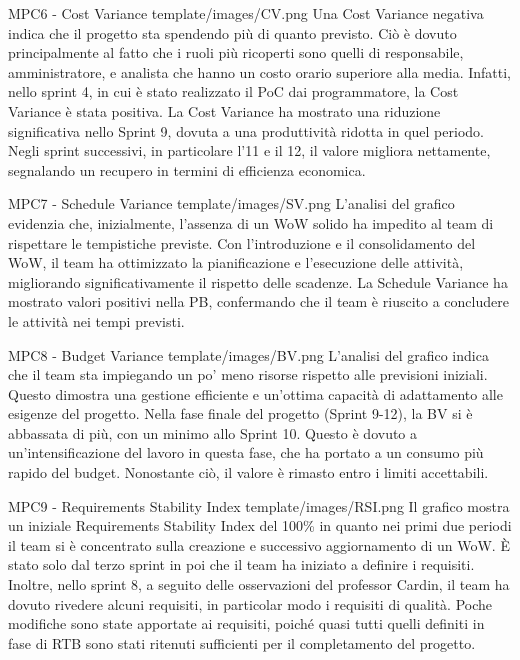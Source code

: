 \Met
{ %
    MPC6 - Cost Variance
}
{ %
    template/images/CV.png
}
{ %
    Una Cost Variance negativa indica che il progetto sta spendendo più di quanto previsto. 
    Ciò è dovuto principalmente al fatto che i ruoli più ricoperti sono quelli di responsabile, 
    amministratore, e analista che hanno un costo orario superiore alla media.
    Infatti, nello sprint 4, in cui è stato realizzato il PoC dai programmatore, la Cost Variance è stata positiva.
}
{ %
    La Cost Variance ha mostrato una riduzione significativa nello Sprint 9, dovuta a una produttività ridotta in quel periodo. Negli sprint successivi, in particolare l'11 e il 12, il valore migliora nettamente, segnalando un recupero in termini di efficienza economica.
}

\Met
{ %
    MPC7 - Schedule Variance
}
{ %
    template/images/SV.png
}
{ %
    L'analisi del grafico evidenzia che, inizialmente, l'assenza di un WoW solido ha impedito al team di rispettare le tempistiche previste. 
    Con l'introduzione e il consolidamento del WoW, il team ha ottimizzato la pianificazione e l'esecuzione delle attività, migliorando significativamente il rispetto delle scadenze.
}
{ %
    La Schedule Variance ha mostrato valori positivi nella PB, confermando che il team è riuscito a concludere le attività nei tempi previsti.
}

\Met
{ %
    MPC8 - Budget Variance
}
{ %
    template/images/BV.png
}
{ %
    L'analisi del grafico indica che il team sta impiegando un po' meno risorse rispetto alle previsioni iniziali.
    Questo dimostra una gestione efficiente e un'ottima capacità di adattamento alle esigenze del progetto.
}
{ %
    Nella fase finale del progetto (Sprint 9-12), la BV si è abbassata di più, con un minimo allo Sprint 10. Questo è dovuto a un’intensificazione del lavoro in questa fase, che ha portato a un consumo più rapido del budget. Nonostante ciò, il valore è rimasto entro i limiti accettabili.
}

\Met
{ %
    MPC9 - Requirements Stability Index
}
{ %
    template/images/RSI.png
}
{ %
    Il grafico mostra un iniziale Requirements Stability Index del 100\% in quanto nei primi due periodi il team si è
    concentrato sulla creazione e successivo aggiornamento di un WoW. 
    È stato solo dal terzo sprint in poi che il team ha iniziato a definire i requisiti.
    Inoltre, nello sprint 8, a seguito delle osservazioni del professor Cardin, il team ha dovuto rivedere alcuni requisiti,
    in particolar modo i requisiti di qualità.
}
{ %
    Poche modifiche sono state apportate ai requisiti, poiché quasi tutti quelli definiti in fase di RTB sono stati ritenuti sufficienti per il completamento del progetto.
}

